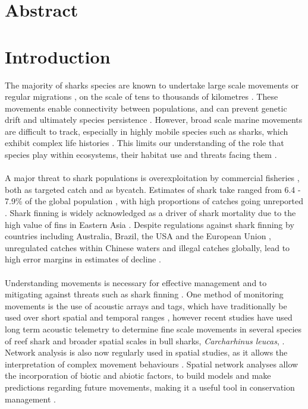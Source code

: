 \documentclass[11pt,a4paper]{article}
\begin{document}
	
	
	\linenumbers
	\newpage
	
	\section{Abstract}
	
	
	\newpage
	
	\section{Introduction}
	
	The majority of sharks species are known to undertake large scale movements or regular migrations \citep{Speed2010,Espinoza2016}, on the scale of tens to thousands of kilometres \citep{Braccini2016a}. These movements enable connectivity between populations, and can prevent genetic drift and ultimately species persistence \citep{Olds2012,Espinoza2016}. However, broad scale marine movements are difficult to track, especially in highly mobile species such as sharks, which exhibit complex life histories \citep{Baeyaert2018}. This limits our understanding of the role that species play within ecosystems, their habitat use and threats facing them \citep{Espinoza2016}.\\
	\\
	A major threat to shark populations is overexploitation by commercial fisheries \citep{Worm2013}, both as targeted catch and as bycatch. Estimates of shark take ranged from 6.4 - 7.9\% of the global population \citep{Worm2013}, with high proportions of catches going unreported \citep{Clarke2006}. Shark finning is widely acknowledged as a driver of shark mortality due to the high value of fins in Eastern Asia \citep{Clarke2013}. Despite regulations against shark finning by countries including Australia, Brazil, the USA and the European Union \citep{Clarke2006,Benavides2011,Braccini2017c}, unregulated catches within Chinese waters and illegal catches globally, lead to high error margins in estimates of decline \citep{Worm2013}.\\
	\\
	Understanding movements is necessary for effective management and to mitigating against threats such as shark finning \citep{Espinoza2016}. One method of monitoring movements is the use of acoustic arrays and tags, which have traditionally be used over short spatial and temporal ranges \citep{Braccini2017}, however recent studies have used long term acoustic telemetry to determine fine scale movements in several species of reef shark \citep{Lea2016} and broader spatial scales in bull sharks, \textit{Carcharhinus leucas}, \citep{Espinoza2016}. Network analysis is also now regularly used in spatial studies, as it allows the interpretation of complex movement behaviours \citep{Lea2016}. Spatial network analyses allow the incorporation of biotic and abiotic factors, to build models and make predictions regarding future movements, making it a useful tool in conservation management \citep{Jacoby2016}.\\ 
\end{document}
